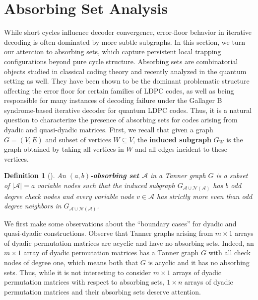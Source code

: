 \documentclass[11pt]{article}
\newtheorem{definition}[lemma]{Definition}
\theoremstyle{plain}
\theoremstyle{plain}
\theoremstyle{definition}
\numberwithin{theo}{section}
\newcounter{ara}
\newcounter{rom}
\begin{document}

\section{Absorbing Set Analysis}
\label{sec:absorbing_set_analysis}

While short cycles influence decoder convergence, error-floor behavior in iterative decoding is often dominated by more subtle subgraphs. In this section, we turn our attention to absorbing sets, which capture persistent local trapping configurations beyond pure cycle structure. Absorbing sets are combinatorial objects studied in classical coding theory \cite{dolecek2009analysis, D10, dolecek2010towards, beemer2019absorbing, mcmillon2023extremal} and recently analyzed in the quantum setting as well\cite{morris2023analysis, Morris2026AMC}. They have been shown to be the dominant problematic structure affecting the error floor for certain families of LDPC codes, as well as being responsible for many instances of decoding failure under the Gallager B syndrome-based iterative decoder for quantum LDPC codes. Thus, it is a natural question to characterize the presence of absorbing sets for codes arising from dyadic and quasi-dyadic matrices. First, we recall that given a graph $G=(V, E)$ and subset of vertices $W \subseteq V$, the \textbf{induced subgraph} $G_W$ is the graph obtained by taking all vertices in $W$ and all edges incident to these vertices. 

\begin{definition}[\hspace{-1sp}\cite{dolecek2009analysis}]
An \textbf{$(a,b)$-absorbing set $\mathcal{A}$} in a Tanner graph $G$ is a subset of $|\mathcal{A}|=a$ variable nodes such that the induced subgraph $G_{\mathcal{A}\cup \mathcal{N}(\mathcal{A})}$ has $b$ odd degree check nodes and every variable node $v \in \mathcal{A}$ has strictly more even than odd degree neighbors in $G_{\mathcal{A}\cup \mathcal{N}(\mathcal{A})}$.
\end{definition}

We first make some observations about the ``boundary cases'' for dyadic and quasi-dyadic constructions. Observe that Tanner graphs arising from $m \times 1$ arrays of dyadic permutation matrices are acyclic and have no absorbing sets. Indeed, an $m \times 1$ array of dyadic permutation matrices has a Tanner graph $G$ with all check nodes of degree one, which means both that $G$ is acyclic and it has no absorbing sets. Thus, while it is not interesting to consider $m \times 1$ arrays of dyadic permutation matrices with respect to absorbing sets,  $1 \times n$ arrays of dyadic permutation matrices and  their absorbing sets deserve attention. 
\end{document}

